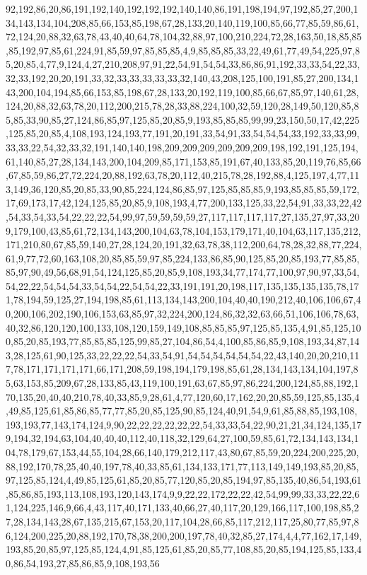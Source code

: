 92,192,86,20,86,191,192,140,192,192,192,140,140,86,191,198,194,97,192,85,27,200,134,143,134,104,208,85,66,153,85,198,67,28,133,20,140,119,100,85,66,77,85,59,86,61,72,124,20,88,32,63,78,43,40,40,64,78,104,32,88,97,100,210,224,72,28,163,50,18,85,85,85,192,97,85,61,224,91,85,59,97,85,85,85,4,9,85,85,85,33,22,49,61,77,49,54,225,97,85,20,85,4,77,9,124,4,27,210,208,97,91,22,54,91,54,54,33,86,86,91,192,33,33,54,22,33,32,33,192,20,20,191,33,32,33,33,33,33,33,32,140,43,208,125,100,191,85,27,200,134,143,200,104,194,85,66,153,85,198,67,28,133,20,192,119,100,85,66,67,85,97,140,61,28,124,20,88,32,63,78,20,112,200,215,78,28,33,88,224,100,32,59,120,28,149,50,120,85,85,85,33,90,85,27,124,86,85,97,125,85,20,85,9,193,85,85,85,99,99,23,150,50,17,42,225,125,85,20,85,4,108,193,124,193,77,191,20,191,33,54,91,33,54,54,54,33,192,33,33,99,33,33,22,54,32,33,32,191,140,140,198,209,209,209,209,209,209,198,192,191,125,194,61,140,85,27,28,134,143,200,104,209,85,171,153,85,191,67,40,133,85,20,119,76,85,66,67,85,59,86,27,72,224,20,88,192,63,78,20,112,40,215,78,28,192,88,4,125,197,4,77,113,149,36,120,85,20,85,33,90,85,224,124,86,85,97,125,85,85,85,9,193,85,85,85,59,172,17,69,173,17,42,124,125,85,20,85,9,108,193,4,77,200,133,125,33,22,54,91,33,33,22,42,54,33,54,33,54,22,22,22,54,99,97,59,59,59,59,27,117,117,117,117,27,135,27,97,33,209,179,100,43,85,61,72,134,143,200,104,63,78,104,153,179,171,40,104,63,117,135,212,171,210,80,67,85,59,140,27,28,124,20,191,32,63,78,38,112,200,64,78,28,32,88,77,224,61,9,77,72,60,163,108,20,85,85,59,97,85,224,133,86,85,90,125,85,20,85,193,77,85,85,85,97,90,49,56,68,91,54,124,125,85,20,85,9,108,193,34,77,174,77,100,97,90,97,33,54,54,22,22,54,54,54,33,54,54,22,54,54,22,33,191,191,20,198,117,135,135,135,135,78,171,78,194,59,125,27,194,198,85,61,113,134,143,200,104,40,40,190,212,40,106,106,67,40,200,106,202,190,106,153,63,85,97,32,224,200,124,86,32,32,63,66,51,106,106,78,63,40,32,86,120,120,100,133,108,120,159,149,108,85,85,85,97,125,85,135,4,91,85,125,100,85,20,85,193,77,85,85,85,125,99,85,27,104,86,54,4,100,85,86,85,9,108,193,34,87,143,28,125,61,90,125,33,22,22,22,54,33,54,91,54,54,54,54,54,54,22,43,140,20,20,210,117,78,171,171,171,171,66,171,208,59,198,194,179,198,85,61,28,134,143,134,104,197,85,63,153,85,209,67,28,133,85,43,119,100,191,63,67,85,97,86,224,200,124,85,88,192,170,135,20,40,40,210,78,40,33,85,9,28,61,4,77,120,60,17,162,20,20,85,59,125,85,135,4,49,85,125,61,85,86,85,77,77,85,20,85,125,90,85,124,40,91,54,9,61,85,88,85,193,108,193,193,77,143,174,124,9,90,22,22,22,22,22,22,54,33,33,54,22,90,21,21,34,124,135,179,194,32,194,63,104,40,40,40,112,40,118,32,129,64,27,100,59,85,61,72,134,143,134,104,78,179,67,153,44,55,104,28,66,140,179,212,117,43,80,67,85,59,20,224,200,225,20,88,192,170,78,25,40,40,197,78,40,33,85,61,134,133,171,77,113,149,149,193,85,20,85,97,125,85,124,4,49,85,125,61,85,20,85,77,120,85,20,85,194,97,85,135,40,86,54,193,61,85,86,85,193,113,108,193,120,143,174,9,9,22,22,172,22,22,42,54,99,99,33,33,22,22,61,124,225,146,9,66,4,43,117,40,171,133,40,66,27,40,117,20,129,166,117,100,198,85,27,28,134,143,28,67,135,215,67,153,20,117,104,28,66,85,117,212,117,25,80,77,85,97,86,124,200,225,20,88,192,170,78,38,200,200,197,78,40,32,85,27,174,4,4,77,162,17,149,193,85,20,85,97,125,85,124,4,91,85,125,61,85,20,85,77,108,85,20,85,194,125,85,133,40,86,54,193,27,85,86,85,9,108,193,56